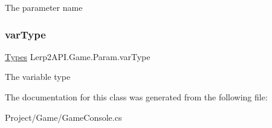 The parameter name 

\mbox{\label{class_lerp2_a_p_i_1_1_game_1_1_param_a44e4fd6a863695d5e967f8132a8a9d33}} 
\subsubsection{\texorpdfstring{var\+Type}{varType}}
{\footnotesize\ttfamily \hyperlink{namespace_lerp2_a_p_i_1_1_game_a2f182da062f210cc43f341f6992ee293}{Types} Lerp2\+A\+P\+I.\+Game.\+Param.\+var\+Type}



The variable type 



The documentation for this class was generated from the following file\+:\begin{DoxyCompactItemize}
\item 
Project/\+Game/Game\+Console.\+cs\end{DoxyCompactItemize}
